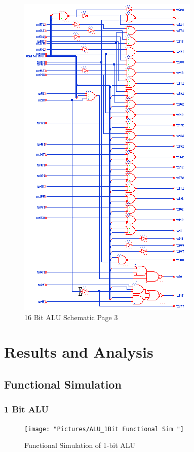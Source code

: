 \documentclass[11pt]{article}
\begin{document}
{		\begin{figure}[H]
			\centering
			\includegraphics[width=0.7\linewidth]{"Pictures/ALU-16Bit Schematic 3"}
			\caption{16 Bit ALU Schematic Page 3}
			\label{fig:alu-16bit-schematic-3}
		\end{figure}


\section{Results and Analysis}

	\subsection{Functional Simulation}
	
		\subsubsection{1 Bit ALU}
		
			\begin{figure}[H]
				\centering
				\texttt{[image: "Pictures/ALU\_1Bit Functional Sim "]}
				\caption{Functional Simulation of 1-bit ALU}
				\label{fig:alu1bit-functional-sim-}
			\end{figure}
		
}
\end{document}
